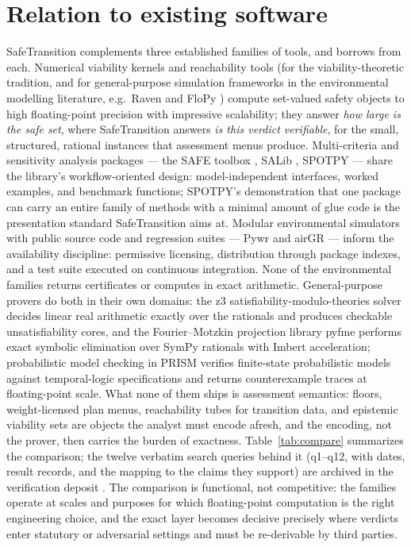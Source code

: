 \documentclass[3p,11pt]{elsarticle}
\begin{document}
\section{Relation to existing software}\label{sec:related}

SafeTransition complements three established families of tools, and borrows
from each. Numerical viability kernels and reachability tools (for the
viability-theoretic tradition, and for general-purpose simulation frameworks
in the environmental modelling literature, e.g.\ Raven
\citep{Craig2020} and FloPy \citep{Bakker2016}) compute set-valued safety
objects to high floating-point precision with impressive scalability; they
answer \emph{how large is the safe set}, where SafeTransition answers
\emph{is this verdict verifiable}, for the small, structured, rational
instances that assessment menus produce. Multi-criteria and sensitivity
analysis packages --- the SAFE toolbox \citep{Pianosi2015}, SALib
\citep{Herman2017}, SPOTPY \citep{Houska2015} --- share the library's
workflow-oriented design: model-independent interfaces, worked examples,
and benchmark functions; SPOTPY's demonstration that one package can carry
an entire family of methods with a minimal amount of glue code is the
presentation standard SafeTransition aims at. Modular environmental
simulators with public source code and regression suites --- Pywr
\citep{Tomlinson2020} and airGR \citep{Coron2017} --- inform the
availability discipline: permissive licensing, distribution through package
indexes, and a test suite executed on continuous integration. None of the environmental
families returns certificates or computes in exact arithmetic. General-purpose
provers do both in their own domains: the z3 satisfiability-modulo-theories
solver \citep{deMoura2008} decides linear real arithmetic exactly over the
rationals and produces checkable unsatisfiability cores, and the Fourier--Motzkin
projection library pyfme \citep{Caron2022} performs exact symbolic
elimination over SymPy rationals with Imbert acceleration; probabilistic
model checking in PRISM \citep{Kwiatkowska2011} verifies finite-state
probabilistic models against temporal-logic specifications and returns
counterexample traces at floating-point scale. What none of them ships is
assessment semantics: floors, weight-licensed plan menus, reachability tubes
for transition data, and epistemic viability sets are objects the analyst
must encode afresh, and the encoding, not the prover, then carries the
burden of exactness. Table~\ref{tab:compare} summarizes the comparison; the
twelve verbatim search queries behind it (q1--q12, with dates, result
records, and the mapping to the claims they support) are archived in the
verification deposit \citep{Deposit2026}. The comparison is functional, not
competitive: the families operate at scales and purposes for which
floating-point computation is the right engineering choice, and the exact
layer becomes decisive precisely where verdicts enter statutory or
adversarial settings and must be re-derivable by third parties.
\end{document}
